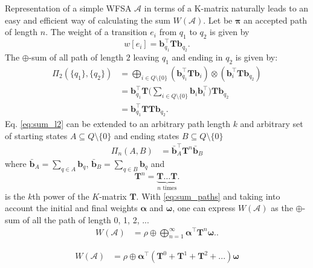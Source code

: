 Representation of a simple WFSA $\mathcal{A}$ in terms of a K-matrix naturally leads to an easy and efficient way of calculating the sum $W(\mathcal{A})$. Let be $\boldsymbol{\pi}$ an accepted path of length $n$. The weight of a transition $e_i$ from $q_1$ to $q_2$ is given by
\begin{equation}
    w[e_i] = \mathbf{b}_{q_1}^\top \mathbf{T} \mathbf{b}_{q_2}. 
\end{equation}
The $\oplus$-sum of all path of length $2$ leaving $q_1$ and ending in $q_2$ is given by:
\begin{align}
    \Pi_2(\{q_1\}, \{q_2\}) &= \bigoplus_{i \in Q \setminus \{0\}} (\mathbf{b}_{q_1}^\top \mathbf{T} \mathbf{b}_{i}) \otimes (\mathbf{b}_{i}^\top \mathbf{T} \mathbf{b}_{q_2}) \\
    &= \mathbf{b}_{q_1}^\top \mathbf{T} \bigg( \sum_{i \in Q \setminus \{0\}} \mathbf{b}_{i} \mathbf{b}_{i}^\top \bigg) \mathbf{T} \mathbf{b}_{q_2} \\
    &= \mathbf{b}_{q_1}^\top \mathbf{T} \mathbf{T} \mathbf{b}_{q_2}. \label{eq:sum_l2}
\end{align}
Eq. \eqref{eq:sum_l2} can be extended to an arbitrary path length $k$ and arbitrary set of starting states $A \subseteq Q \setminus \{0\}$ and ending states $B \subseteq Q \setminus \{0\}$
\begin{align}
    \Pi_n(A, B) &= \bar{\mathbf{b}}_A^\top  \mathbf{T}^n \bar{\mathbf{b}}_B \label{eq:sum_paths}
\end{align}
where $\bar{\mathbf{b}}_A = \sum_{q \in A} \mathbf{b}_q$, $\bar{\mathbf{b}}_B = \sum_{q \in B} \mathbf{b}_q$ and 
\begin{equation} 
    \mathbf{T}^n = \underbrace{\mathbf{T} \dots \mathbf{T}}_{n \text{ times}}.
\end{equation}
is the $k$th power of the $K$-matrix $\mathbf{T}$. With \eqref{eq:sum_paths} and taking into account the initial and final weights $\boldsymbol{\alpha}$ and $\boldsymbol{\omega}$, one can express $W(\mathcal{A})$ as the $\oplus$-sum of all the path of length 0, 1, 2, ...
\begin{align}
    W(\mathcal{A}) &= \rho \oplus \bigoplus_{n=1}^\infty \boldsymbol{\alpha}^\top \mathbf{T}^n \boldsymbol{\omega}. \label{eq:total_sum}.
\end{align}

\begin{align}
    W(\mathcal{A}) &= \rho \oplus \boldsymbol{\alpha}^\top ( \mathbf{T}^0 + \mathbf{T}^1 + \mathbf{T}^2 + ...   )\boldsymbol{\omega} \label{eq:total_sum}
\end{align}

